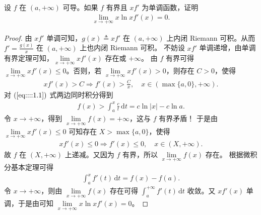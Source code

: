 \documentclass[../../main.tex]{subfiles}%
\begin{document}
\begin{example}
设 \(f\) 在 \((a,+\infty)\) 可导。如果 \(f\) 有界且 \(xf'\) 为单调函数，证明
\begin{align*}
\lim_{x \to +\infty} x\ln x f'(x) = 0.
\end{align*}
\end{example}
\begin{proof}

由 \(xf'\) 单调可知，\(g(x)\triangleq xf'\) 在 \((a, +\infty)\) 上内闭 Riemann 可积。从而 \(f' = \frac{g(x)}{x}\) 在 \((a, +\infty)\) 上也内闭 Riemann 可积。
不妨设 \(xf'\) 单调递增，由单调有界定理可知，\(\lim\limits_{x \to +\infty}xf'(x)\) 存在或 \(+\infty\)。
由 \(f\) 有界可得 \(\lim\limits_{x \to +\infty}xf'(x)\leqslant 0\)。否则，若 \(\lim\limits_{x \to +\infty}xf'(x)>0\)，则存在 \(C > 0\)，使得
\begin{align}
xf'(x)>C \Rightarrow f'(x)>\frac{C}{x}, \quad x\in (\max\{a,0\}, +\infty). \label{eq::::1.1}
\end{align}
对 \((\ref{eq::::1.1})\) 式两边同时积分得到
\begin{align*}
f(x)>\int_a^x\frac{c}{t}\,\mathrm{d}t = c\ln|x|-c\ln a.
\end{align*}
令 \(x \to +\infty\)，得到 \(\lim\limits_{x \to +\infty}f(x)=+\infty\)，这与 \(f\) 有界矛盾！
于是由 \(\lim\limits_{x \to +\infty}xf'(x)\leqslant 0\) 可知存在 \(X > \max\{a,0\}\)，使得
\begin{align*}
xf'(x)\leqslant 0 \Rightarrow f'(x)\leqslant 0, \quad x\in (X, +\infty).
\end{align*}
故 \(f\) 在 \((X, +\infty)\) 上递减。又因为 \(f\) 有界，所以 \(\lim\limits_{x \to +\infty}f(x)\) 存在。
根据微积分基本定理可得
\begin{align*}
\int_a^x f'(t)\,\mathrm{d}t = f(x)-f(a).
\end{align*}
令 \(x \to +\infty\)，则由 \(\lim\limits_{x \to +\infty}f(x)\) 存在可得 \(\int_a^{+\infty}f'(t)\,\mathrm{d}t\) 收敛。又 \(xf'(x)\) 单调，于是由可知 \(\lim\limits_{x \to +\infty}x\ln x f'(x)=0\)。 


\end{proof}
\end{document}
